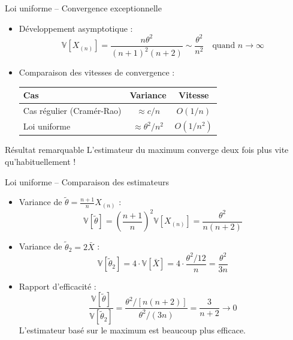 \documentclass[11pt,aspectratio=169]{beamer}
\begin{document}
\begin{frame}{Loi uniforme -- Convergence exceptionnelle}

\begin{itemize}

\item Développement asymptotique :
  \[
  \mathbb{V}[X_{(n)}] = \frac{n\theta^2}{(n+1)^2(n+2)} \sim \frac{\theta^2}{n^2} \quad \text{quand } n \to \infty
  \]

\item Comparaison des vitesses de convergence :\newline

\begin{center}
\begin{tabular}{lcc}
\hline
Cas & Variance & Vitesse \\
\hline
Cas régulier (Cramér-Rao) & $\approx c/n$ & $O(1/n)$ \\[0.3em]
Loi uniforme & $\approx \theta^2/n^2$ & $O(1/n^2)$ \\
\hline
\end{tabular}
\end{center}

\end{itemize}

\medskip

\begin{alertblock}{Résultat remarquable}
L'estimateur du maximum converge deux fois plus vite qu'habituellement !
\end{alertblock}

\end{frame}

\begin{frame}{Loi uniforme -- Comparaison des estimateurs}

\begin{itemize}

\item Variance de $\tilde{\theta} = \frac{n+1}{n} X_{(n)}$ :
  \[
  \mathbb{V}[\tilde{\theta}] = \left(\frac{n+1}{n}\right)^2 \mathbb{V}[X_{(n)}] = \frac{\theta^2}{n(n+2)}
  \]

\item Variance de $\tilde{\theta}_2 = 2\bar{X}$ :
  \[
  \mathbb{V}[\tilde{\theta}_2] = 4 \cdot \mathbb{V}[\bar{X}] = 4 \cdot \frac{\theta^2/12}{n} = \frac{\theta^2}{3n}
  \]

\item Rapport d'efficacité :
  \[
  \frac{\mathbb{V}[\tilde{\theta}]}{\mathbb{V}[\tilde{\theta}_2]} = \frac{\theta^2/[n(n+2)]}{\theta^2/(3n)} = \frac{3}{n+2} \to 0
  \]
  L'estimateur basé sur le maximum est beaucoup plus efficace.

\end{itemize}

\end{frame}
\end{document}
